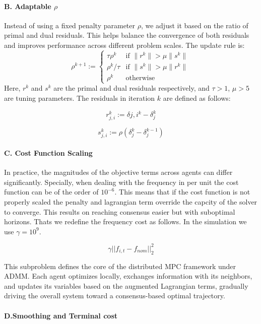 \documentclass{article}
\begin{document}
\paragraph{B. Adaptable \(\rho\)} 


Instead of using a fixed penalty parameter \( \rho \), we adjust it based on the ratio of primal and dual residuals. This helps balance the convergence of both residuals and improves performance across different problem scales\cite{ADMM:boyd}. The update rule is:
\[
\rho^{k+1} := 
\begin{cases}
\tau \rho^k & \text{if } \|r^k\| > \mu \|s^k\| \\
\rho^k / \tau & \text{if } \|s^k\| > \mu \|r^k\| \\
\rho^k & \text{otherwise}
\end{cases}
\]
Here, \( r^k \) and \( s^k \) are the primal and dual residuals respectively, and \( \tau > 1 \), \( \mu > 5 \) are tuning parameters. The residuals in iteration $k$ are defined as follows:

\[
r_{j,i}^k := \delta{j,i}^k - \delta_j^k
\]

\[
s_{j,i}^k := \rho \left( \delta_j^k - \delta_j^{k-1} \right)
\]

\paragraph{C. Cost Function Scaling} 
In practice, the magnitudes of the objective terms across agents can differ significantly. Specially, when dealing with the frequency in per unit the cost function can be of the order of $10^{-6}$. This means that if the cost function is not properly scaled the penalty and lagrangian term override the capcity of the solver to converge. This results on reaching consensus easier but with suboptimal horizons. Thats we redefine the frequency cost as follows. In the simulation we use $\gamma = 10^9$.

\begin{equation}
    \gamma ||f_{i,t} - f_{nom}||_2^2
\end{equation}

This subproblem defines the core of the distributed MPC framework under ADMM. Each agent optimizes locally, exchanges information with its neighbors, and updates its variables based on the augmented Lagrangian terms, gradually driving the overall system toward a consensus-based optimal trajectory.

\paragraph{D.Smoothing and Terminal cost} 
\end{document}
